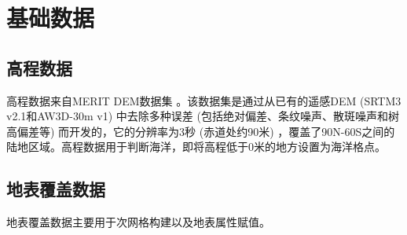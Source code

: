 \chapter{基础数据}\label{基础数据}


\section{高程数据}
高程数据来自MERIT DEM数据集 \citep{yamazaki2017high}。该数据集是通过从已有的遥感DEM (SRTM3 v2.1和AW3D-30m v1) 中去除多种误差 (包括绝对偏差、条纹噪声、散斑噪声和树高偏差等) 而开发的，它的分辨率为3秒 (赤道处约90米) ，覆盖了90N-60S之间的陆地区域。高程数据用于判断海洋，即将高程低于0米的地方设置为海洋格点。

\section{地表覆盖数据}\label{地表覆盖数据}
地表覆盖数据主要用于次网格构建以及地表属性赋值。
